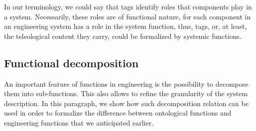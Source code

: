 \documentclass[sw]{iosart2x}
\newcommand{\TODOinline}[1]{{%
}}
\begin{document}
In our terminology, we could say that tags identify  roles that components play in a system. Necessarily, these roles are of functional nature, for each component in an engineering system has a role in the system function, thus, tags, or, at least, the teleological content they carry, could be formalized by systemic functions. %
\TODOinline{[SB: manca un risultato conclusivo che giustifichi perché ci fermiamo qui. bisogna dare almeno qualche indicazione di quali concetti di funzione usati in ingegneria cadono sotto questo approccio (nel senso che possono essere considerate specializzazioni di queste definizioni)][ Ho provato a inserire un paragrafo argomentando che le "generally valid functions" di Pahl e Beitz assomigliano alle funz.ont. e che i tag/sigle/functional location assomigliano alle fun.sys.]*[SB: ok, per ora va bene. magari in fase di revisione vediamo se riusciamo ad approfondire questo punto][FC:ok]}

\subsection{Functional decomposition}
An important feature of functions in engineering is the possibility to decompose them into sub-functions. This also allows to refine the granularity of the system description. In this paragraph, we show how such decomposition relation can be used in order to formalize the difference between ontological functions and engineering functions that we anticipated earlier.
\end{document}
